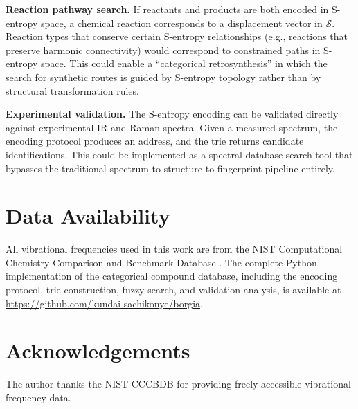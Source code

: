 \documentclass[11pt,twocolumn,a4paper]{article}
\theoremstyle{definition}
\theoremstyle{remark}
\newcommand{\Sspace}{\mathcal{S}}
\begin{document}
\textbf{Reaction pathway search.} If reactants and products are both encoded in S-entropy space, a chemical reaction corresponds to a displacement vector in $\Sspace$. Reaction types that conserve certain S-entropy relationships (e.g., reactions that preserve harmonic connectivity) would correspond to constrained paths in S-entropy space. This could enable a ``categorical retrosynthesis'' in which the search for synthetic routes is guided by S-entropy topology rather than by structural transformation rules.

\textbf{Experimental validation.} The S-entropy encoding can be validated directly against experimental IR and Raman spectra. Given a measured spectrum, the encoding protocol produces an address, and the trie returns candidate identifications. This could be implemented as a spectral database search tool that bypasses the traditional spectrum-to-structure-to-fingerprint pipeline entirely.

\section*{Data Availability}

All vibrational frequencies used in this work are from the NIST Computational Chemistry Comparison and Benchmark Database \citep{johnson2022}. The complete Python implementation of the categorical compound database, including the encoding protocol, trie construction, fuzzy search, and validation analysis, is available at \url{https://github.com/kundai-sachikonye/borgia}.

\section*{Acknowledgements}

The author thanks the NIST CCCBDB for providing freely accessible vibrational frequency data.



\end{document}
